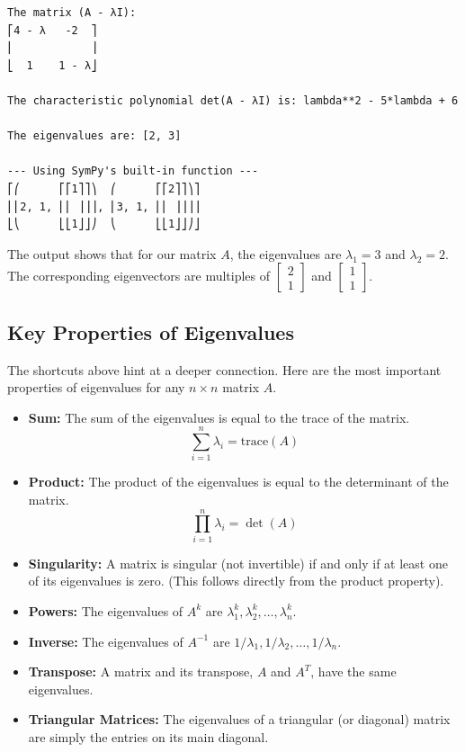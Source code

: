\documentclass[
  letterpaper,
  DIV=11,
  numbers=noendperiod]{scrreprt}
\providecommand{\tightlist}{%
  \setlength{\itemsep}{0pt}\setlength{\parskip}{0pt}}
\begin{document}
\begin{verbatim}
The matrix (A - λI):
⎡4 - λ   -2  ⎤
⎢            ⎥
⎣  1    1 - λ⎦

The characteristic polynomial det(A - λI) is: lambda**2 - 5*lambda + 6

The eigenvalues are: [2, 3]

--- Using SymPy's built-in function ---
⎡⎛      ⎡⎡1⎤⎤⎞  ⎛      ⎡⎡2⎤⎤⎞⎤
⎢⎜2, 1, ⎢⎢ ⎥⎥⎟, ⎜3, 1, ⎢⎢ ⎥⎥⎟⎥
⎣⎝      ⎣⎣1⎦⎦⎠  ⎝      ⎣⎣1⎦⎦⎠⎦
\end{verbatim}

The output shows that for our matrix \(A\), the eigenvalues are
\(\lambda_1 = 3\) and \(\lambda_2 = 2\). The corresponding eigenvectors
are multiples of \(\begin{bmatrix} 2 \\ 1 \end{bmatrix}\) and
\(\begin{bmatrix} 1 \\ 1 \end{bmatrix}\).

\subsection{Key Properties of
Eigenvalues}\label{key-properties-of-eigenvalues}

The shortcuts above hint at a deeper connection. Here are the most
important properties of eigenvalues for any \(n \times n\) matrix \(A\).

\begin{itemize}
\tightlist
\item
  \textbf{Sum:} The sum of the eigenvalues is equal to the trace of the
  matrix. \[ \sum_{i=1}^{n} \lambda_i = \text{trace}(A) \]
\item
  \textbf{Product:} The product of the eigenvalues is equal to the
  determinant of the matrix. \[ \prod_{i=1}^{n} \lambda_i = \det(A) \]
\item
  \textbf{Singularity:} A matrix is singular (not invertible) if and
  only if at least one of its eigenvalues is zero. (This follows
  directly from the product property).
\item
  \textbf{Powers:} The eigenvalues of \(A^k\) are
  \(\lambda_1^k, \lambda_2^k, \dots, \lambda_n^k\).
\item
  \textbf{Inverse:} The eigenvalues of \(A^{-1}\) are
  \(1/\lambda_1, 1/\lambda_2, \dots, 1/\lambda_n\).
\item
  \textbf{Transpose:} A matrix and its transpose, \(A\) and \(A^T\),
  have the same eigenvalues.
\item
  \textbf{Triangular Matrices:} The eigenvalues of a triangular (or
  diagonal) matrix are simply the entries on its main diagonal.
\end{itemize}
\end{document}
